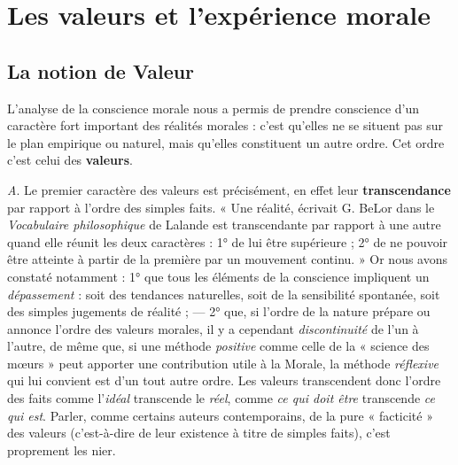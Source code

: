
\section{Les valeurs et l'expérience morale}
\subsection{La notion de Valeur}
L'analyse de la conscience morale
nous a permis de prendre conscience d’un caractère fort important des
réalités morales : c’est qu’elles ne se situent pas sur le plan empirique
ou naturel, mais qu’elles constituent un autre ordre. Cet ordre
c’est celui des {\bf valeurs}.

{\it A}. Le premier caractère des valeurs est précisément, en effet
leur {\bf transcendance} par rapport à l’ordre des simples faits. « Une réalité,
écrivait G. BeLor dans le {\it Vocabulaire philosophique} de Lalande
est transcendante par rapport à une autre quand elle réunit les deux
caractères : 1° de lui être supérieure ; 2° de ne pouvoir être atteinte à
partir de la première par un mouvement continu. » Or nous avons
constaté notamment : 1° que tous les éléments de la conscience
impliquent un {\it dépassement} : soit des tendances naturelles, soit de la
sensibilité spontanée, soit des simples jugements de réalité ; — 2° que,
si l’ordre de la nature prépare ou annonce l’ordre des valeurs morales,
il y a cependant {\it discontinuité} de l’un à l’autre, de même que, si une
méthode {\it positive} comme celle de la « science des mœurs » peut
apporter une contribution utile à la Morale, la méthode {\it réflexive} qui
lui convient est d’un tout autre ordre. Les valeurs transcendent donc
l’ordre des faits comme l'{\it idéal} transcende le {\it réel}, comme {\it ce qui doit
être} transcende {\it ce qui est}. Parler, comme certains auteurs contemporains,
de la pure « facticité » des valeurs (c’est-à-dire de leur existence
à titre de simples faits), c’est proprement les nier.


